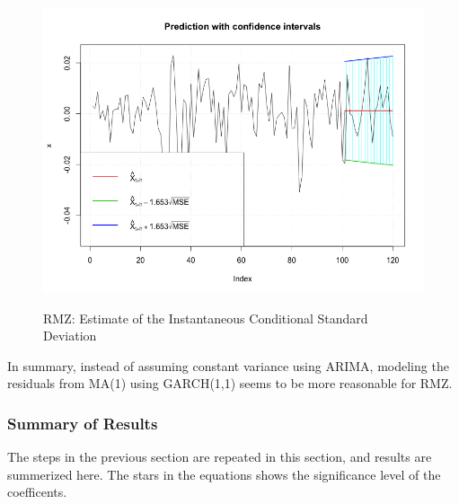 \documentclass[12pt]{article}
\begin{document}
\begin{figure}
  \caption{RMZ: Estimate of the Instantaneous Conditional Standard Deviation}
  \includegraphics[width = \textwidth]{../results/RMZ_GARCH_predCI}
  \label{fig:RMZ_GARCH_predCI}
\end{figure}

In summary, instead of assuming constant variance using ARIMA, modeling the residuals from MA(1) using GARCH(1,1) seems to be more reasonable for RMZ.

\subsubsection{Summary of Results}
The steps in the previous section are repeated in this section, and results are summerized here. The stars in the equations shows the significance level of the coefficents. 
\end{document}
